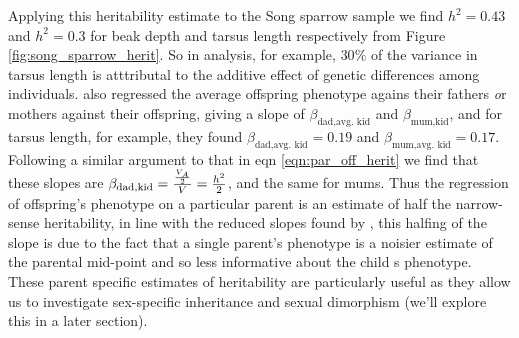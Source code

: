 Applying this heritability estimate to the Song sparrow sample we find
$h^2=0.43$ and $h^2=0.3$ for beak depth and tarsus length
respectively from Figure
\ref{fig:song_sparrow_herit}. So in \citet{smith1979heritability} analysis, for example,
$30\%$ of the variance in tarsus length is atttributal to the additive
effect of genetic
differences among individuals. 
\citet{smith1979heritability} also regressed the average offspring
phenotype agains their fathers {\emph or} mothers against their
offspring, giving a slope of $\beta_{\textrm{dad}, \textrm{avg. kid}}$ and
$\beta_{\textrm{mum}, \textrm{kid}}$, and for tarsus length, for
example, they found $\beta_{\textrm{dad},
  \textrm{avg. kid}}= 0.19$ and $\beta_{\textrm{mum},
  \textrm{avg. kid}}= 0.17$.  Following a similar argument to
that in eqn
\eqref{eqn:par_off_herit} we find that these slopes are $\beta_{\textrm{dad}, \textrm{kid}}=
\nicefrac{\nicefrac{V_{A}}{2}}{V} = \nicefrac{h^2}{2}$, and the same
  for mums. Thus the regression of offspring's phenotype on a
  particular parent is an estimate of half the narrow-sense
  heritability, in line with the reduced slopes found by
  \citet{smith1979heritability}, this halfing of the slope is due to the
  fact that a single parent's phenotype is a noisier estimate of the
  parental mid-point and so less informative about the child
  s phenotype. These parent specific estimates of heritability are
  particularly useful as they allow us to investigate sex-specific inheritance and sexual
  dimorphism (we'll explore this in a later section). 


